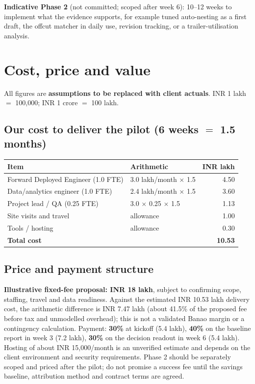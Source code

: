 \documentclass[10pt,a4paper]{article}
\begin{document}
\textbf{Indicative Phase 2} (not committed; scoped after week 6): 10--12 weeks to implement what the evidence supports, for example tuned auto-nesting as a first draft, the offcut matcher in daily use, revision tracking, or a trailer-utilisation analysis.

\section{Cost, price and value}
All figures are \textbf{assumptions to be replaced with client actuals}. INR 1 lakh $=$ 100{,}000; INR 1 crore $=$ 100 lakh.

\subsection{Our cost to deliver the pilot (6 weeks $=$ 1.5 months)}
\small
\begin{tabular}{@{}P{6.0cm}P{6.6cm}r@{}}
\toprule
\textbf{Item} & \textbf{Arithmetic} & \textbf{INR lakh} \\
\midrule
Forward Deployed Engineer (1.0 FTE) & 3.0 lakh/month $\times$ 1.5 & 4.50 \\
Data/analytics engineer (1.0 FTE) & 2.4 lakh/month $\times$ 1.5 & 3.60 \\
Project lead / QA (0.25 FTE) & 3.0 $\times$ 0.25 $\times$ 1.5 & 1.13 \\
Site visits and travel & allowance & 1.00 \\
Tools / hosting & allowance & 0.30 \\
\midrule
\textbf{Total cost} &  & \textbf{10.53} \\
\bottomrule
\end{tabular}
\normalsize

\subsection{Price and payment structure}
\textbf{Illustrative fixed-fee proposal: INR 18 lakh}, subject to confirming scope, staffing, travel and data readiness. Against the estimated INR 10.53 lakh delivery cost, the arithmetic difference is INR 7.47 lakh (about 41.5\% of the proposed fee before tax and unmodelled overhead); this is not a validated Banao margin or a contingency calculation. Payment: \textbf{30\%} at kickoff (5.4 lakh), \textbf{40\%} on the baseline report in week 3 (7.2 lakh), \textbf{30\%} on the decision readout in week 6 (5.4 lakh). Hosting of about INR 15{,}000/month is an unverified estimate and depends on the client environment and security requirements. Phase 2 should be separately scoped and priced after the pilot; do not promise a success fee until the savings baseline, attribution method and contract terms are agreed.
\end{document}
